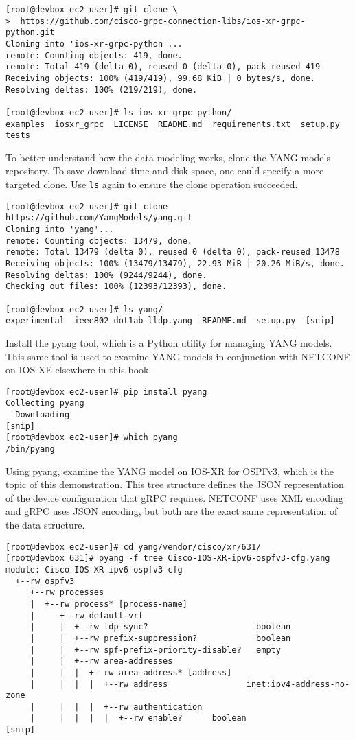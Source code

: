\begin{verbatim}
[root@devbox ec2-user]# git clone \
>  https://github.com/cisco-grpc-connection-libs/ios-xr-grpc-python.git
Cloning into 'ios-xr-grpc-python'...
remote: Counting objects: 419, done.
remote: Total 419 (delta 0), reused 0 (delta 0), pack-reused 419
Receiving objects: 100% (419/419), 99.68 KiB | 0 bytes/s, done.
Resolving deltas: 100% (219/219), done.

[root@devbox ec2-user]# ls ios-xr-grpc-python/
examples  iosxr_grpc  LICENSE  README.md  requirements.txt  setup.py  tests
\end{verbatim}

To better understand how the data modeling works, clone the YANG models
repository. To save download time and disk space, one could specify a more
targeted clone. Use \verb|ls| again to ensure the clone operation succeeded.

\begin{verbatim}
[root@devbox ec2-user]# git clone https://github.com/YangModels/yang.git
Cloning into 'yang'...
remote: Counting objects: 13479, done.
remote: Total 13479 (delta 0), reused 0 (delta 0), pack-reused 13478
Receiving objects: 100% (13479/13479), 22.93 MiB | 20.26 MiB/s, done.
Resolving deltas: 100% (9244/9244), done.
Checking out files: 100% (12393/12393), done.

[root@devbox ec2-user]# ls yang/
experimental  ieee802-dot1ab-lldp.yang  README.md  setup.py  [snip]
\end{verbatim}

Install the pyang tool, which is a Python utility for managing YANG models.
This same tool is used to examine YANG models in conjunction with NETCONF on
IOS-XE elsewhere in this book.

\begin{verbatim}
[root@devbox ec2-user]# pip install pyang
Collecting pyang
  Downloading
[snip]
[root@devbox ec2-user]# which pyang
/bin/pyang
\end{verbatim}

Using pyang, examine the YANG model on IOS-XR for OSPFv3, which is the topic
of this demonstration. This tree structure defines the JSON representation of
the device configuration that gRPC requires. NETCONF uses XML encoding and
gRPC uses JSON encoding, but both are the exact same representation of the
data structure.

\begin{verbatim}
[root@devbox ec2-user]# cd yang/vendor/cisco/xr/631/
[root@devbox 631]# pyang -f tree Cisco-IOS-XR-ipv6-ospfv3-cfg.yang
module: Cisco-IOS-XR-ipv6-ospfv3-cfg
  +--rw ospfv3
     +--rw processes
     |  +--rw process* [process-name]
     |     +--rw default-vrf
     |     |  +--rw ldp-sync?                      boolean
     |     |  +--rw prefix-suppression?            boolean
     |     |  +--rw spf-prefix-priority-disable?   empty
     |     |  +--rw area-addresses
     |     |  |  +--rw area-address* [address]
     |     |  |  |  +--rw address                inet:ipv4-address-no-zone
     |     |  |  |  +--rw authentication
     |     |  |  |  |  +--rw enable?      boolean
[snip]
\end{verbatim}


